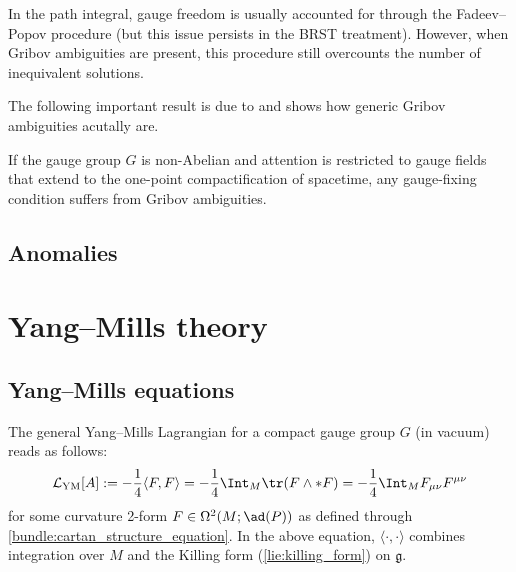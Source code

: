 
    In the path integral, gauge freedom is usually accounted for through the Fadeev--Popov procedure (but this issue persists in the BRST treatment). However, when Gribov ambiguities are present, this procedure still overcounts the number of inequivalent solutions. 

    The following important result is due to  and shows how generic Gribov ambiguities acutally are.
    \begin{property}
        If the gauge group $G$ is non-Abelian and attention is restricted to gauge fields that extend to the one-point compactification of spacetime, any gauge-fixing condition suffers from Gribov ambiguities.
    \end{property}

\subsection{Anomalies}



\section{Yang--Mills theory}\label{section:yang_mills_theory}
\subsection{Yang--Mills equations}

    The general Yang--Mills Lagrangian for a compact gauge group $G$ (in vacuum) reads as follows:
    \begin{gather}
        \label{gauge:YM_lagrangian}
        \mathcal{L}_{\text{YM}}[A] := -\frac{1}{4}\langle F,F\rangle = -\frac{1}{4}\Int_M\tr(F\wedge\ast F) = -\frac{1}{4}\Int_MF_{\mu\nu}F^{\mu\nu}
    \end{gather}
    for some curvature 2-form $F\in\Omega^2(M;\ad(P))$ as defined through \cref{bundle:cartan_structure_equation}. In the above equation, $\langle\cdot,\cdot\rangle$ combines integration over $M$ and the Killing form (\cref{lie:killing_form}) on $\mathfrak{g}$.

